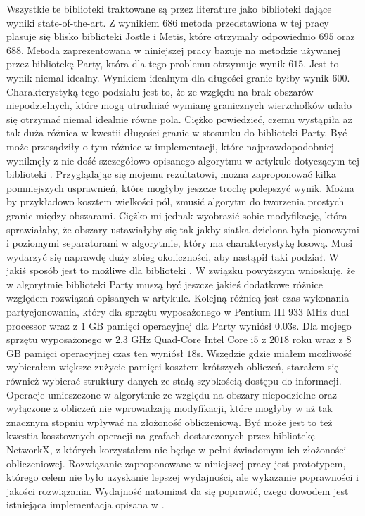 Wszystkie te biblioteki traktowane są przez literature jako biblioteki dające wyniki state-of-the-art.
Z wynikiem $686$ metoda przedstawiona w tej pracy plasuje się blisko biblioteki Jostle i Metis,
które otrzymały odpowiednio $695$ oraz $688$.
Metoda zaprezentowana w niniejszej pracy bazuje na metodzie używanej przez bibliotekę Party, która dla tego problemu
otrzymuje wynik $615$.
Jest to wynik niemal idealny.
Wynikiem idealnym dla długości granic byłby wynik $600$.
Charakterystyką tego podziału jest to, że ze względu na brak obszarów niepodzielnych, które mogą utrudniać
wymianę granicznych wierzchołków udało się otrzymać niemal idealnie równe pola.
Ciężko powiedzieć, czemu wystąpiła aż tak duża różnica w kwestii długości granic w stosunku do biblioteki Party.
Być może przesądziły o tym różnice w implementacji, które najprawdopodobniej wyniknęły z nie dość szczegółowo opisanego algorytmu
w artykule dotyczącym tej biblioteki \cite{1364754}.
Przyglądając się mojemu rezultatowi, można zaproponować kilka pomniejszych usprawnień, które mogłyby jeszcze trochę polepszyć wynik.
Można by przykładowo kosztem wielkości pól, zmusić algorytm do tworzenia prostych granic między obszarami.
Ciężko mi jednak wyobrazić sobie modyfikację, która sprawiałaby, że obszary ustawiałyby się tak jakby siatka dzielona
była pionowymi i poziomymi separatorami w algorytmie, który ma charakterystykę losową.
Musi wydarzyć się naprawdę duży zbieg okoliczności, aby nastąpił taki podział.
W jakiś sposób jest to możliwe dla biblioteki \cite{1364754}.
W związku powyższym wnioskuję, że w algorytmie biblioteki Party \cite{1364754} muszą być jeszcze jakieś dodatkowe
różnice względem rozwiązań opisanych w artykule.
Kolejną różnicą jest czas wykonania partycjonowania, który dla sprzętu wyposażonego w Pentium III $933$ MHz dual processor
wraz z $1$ GB pamięci operacyjnej dla Party wyniósł $0.03$s.
Dla mojego sprzętu wyposażonego w $2.3$ GHz Quad-Core Intel Core i$5$ z $2018$ roku wraz z $8$ GB pamięci operacyjnej
czas ten wyniósł $18$s.
Wszędzie gdzie miałem możliwość wybierałem większe zużycie pamięci kosztem krótszych obliczeń, starałem się również
wybierać struktury danych ze stałą szybkością dostępu do informacji.
Operacje umieszczone w algorytmie ze względu na obszary niepodzielne oraz wyłączone z obliczeń nie wprowadzają
modyfikacji, które mogłyby w aż tak znacznym stopniu wpływać na złożoność obliczeniową.
Być może jest to też kwestia kosztownych operacji na grafach dostarczonych przez bibliotekę NetworkX,
z których korzystałem nie będąc w pełni świadomym ich złożoności obliczeniowej.
Rozwiązanie zaproponowane w niniejszej pracy jest prototypem, którego celem
nie było uzyskanie lepszej wydajności, ale wykazanie poprawności i jakości rozwiązania.
Wydajność natomiast da się poprawić, czego dowodem jest istniejąca implementacja opisana w \cite{1364754}.

